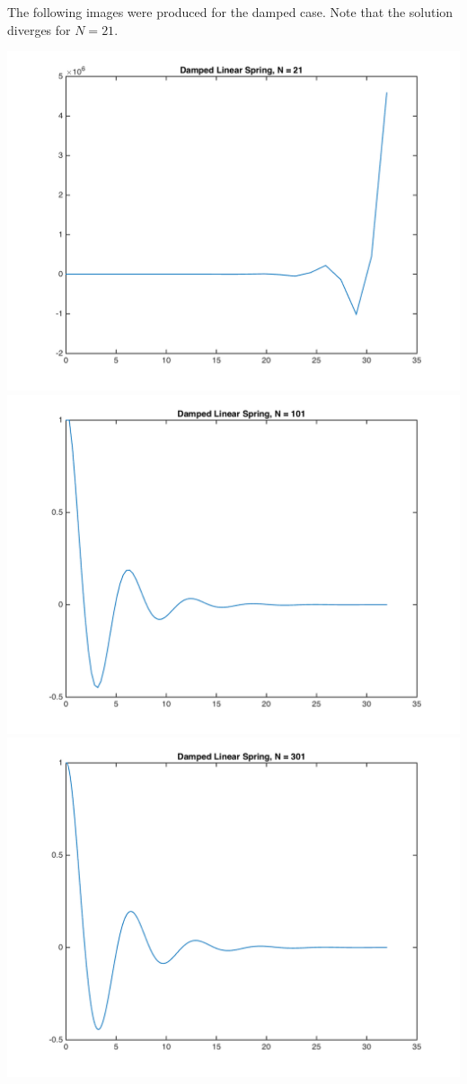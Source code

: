 \documentclass[11pt, oneside]{article}
\begin{document}
\begin{enumerate}
    The following images were produced for the damped case.
    Note that the solution diverges for $N = 21$.
    \begin{center}
      \includegraphics[scale=.4]{Figures/01_20.png}
      \includegraphics[scale=.4]{Figures/01_21.png}
      \includegraphics[scale=.4]{Figures/01_22.png}

\end{center}
\end{enumerate}
\end{document}
